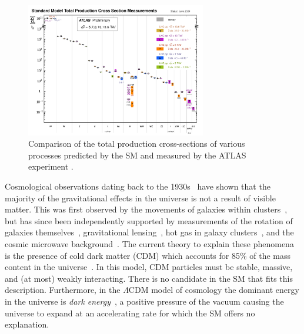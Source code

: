 \begin{figure}
    \centering
    \includegraphics[width=0.7\textwidth]{Figures/standard_model/sm_summary.pdf}
    \caption{Comparison of the total production cross-sections of various processes predicted by the SM and measured by the ATLAS experiment \cite{ATLAS:2024cgh}.}
    \label{fig:sm_precision}
\end{figure}

Cosmological observations dating back to the 1930s~\cite{GalaxyRotation} have shown that the majority of the gravitational effects in the universe is not a result of visible matter.
This was first observed by the movements of galaxies within clusters~\cite{GalaxyRotation}, but has since been independently supported by measurements of the rotation of galaxies themselves~\cite{DistributionDarkMatter, EvidenceDarkMatter,NumericalStudyStability}, gravitational lensing~\cite{GravitationalLensMagnification, Lensing1, Lensing2},
hot gas in galaxy clusters~\cite{HotGas}, and the cosmic microwave background~\cite{Planck2018Results}.
The current theory to explain these phenomena is the presence of cold dark matter (CDM) which accounts for 85\% of the mass content in the universe~\cite{Planck2018Results}.
In this model, CDM particles must be stable, massive, and (at most) weakly interacting.
There is no candidate in the SM that fits this description.
Furthermore, in the $\Lambda$CDM model of cosmology the dominant energy in the universe is \textit{dark energy}~\cite{LCDM1, LCDM2, LCDM3, LCDM4}, a positive pressure of the vacuum causing the universe to expand at an accelerating rate for which the SM offers no explanation.

